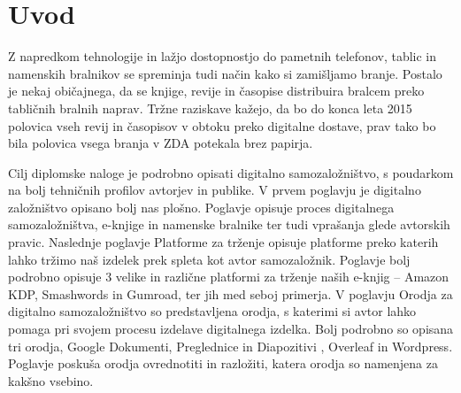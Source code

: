 \documentclass[a4paper, 12pt]{book}
\begin{document}

\mainmatter
\setcounter{page}{1}
\pagestyle{fancy}

\chapter{Uvod}
Z napredkom tehnologije in lažjo dostopnostjo do pametnih telefonov, tablic in namenskih bralnikov se spreminja tudi način kako si zamišljamo branje. Postalo je nekaj običajnega, da se knjige, revije in časopise distribuira bralcem preko tabličnih bralnih naprav. Tržne raziskave kažejo, da bo do konca leta 2015 polovica vseh revij in časopisov v obtoku preko digitalne dostave,\cite{2} prav tako bo bila polovica vsega branja v ZDA potekala brez papirja.\cite{3}

Cilj diplomske naloge je podrobno opisati digitalno samozaložništvo, s poudarkom na bolj tehničnih profilov avtorjev in publike. V prvem poglavju je digitalno založništvo opisano bolj nas plošno. Poglavje opisuje proces digitalnega samozaložništva, e-knjige in namenske bralnike ter tudi vprašanja glede avtorskih pravic. Naslednje poglavje Platforme za trženje opisuje platforme preko katerih lahko tržimo naš izdelek prek spleta kot avtor samozaložnik. Poglavje bolj podrobno opisuje 3 velike in različne platformi za trženje naših e-knjig – Amazon KDP, Smashwords in Gumroad, ter jih med seboj primerja. V poglavju Orodja za digitalno samozaložništvo so predstavljena orodja, s katerimi si avtor lahko pomaga pri svojem procesu izdelave digitalnega izdelka. Bolj podrobno so opisana tri orodja, Google Dokumenti, Preglednice in Diapozitivi , Overleaf in Wordpress. Poglavje poskuša orodja ovrednotiti in razložiti, katera orodja so namenjena za kakšno vsebino.
\end{document}

